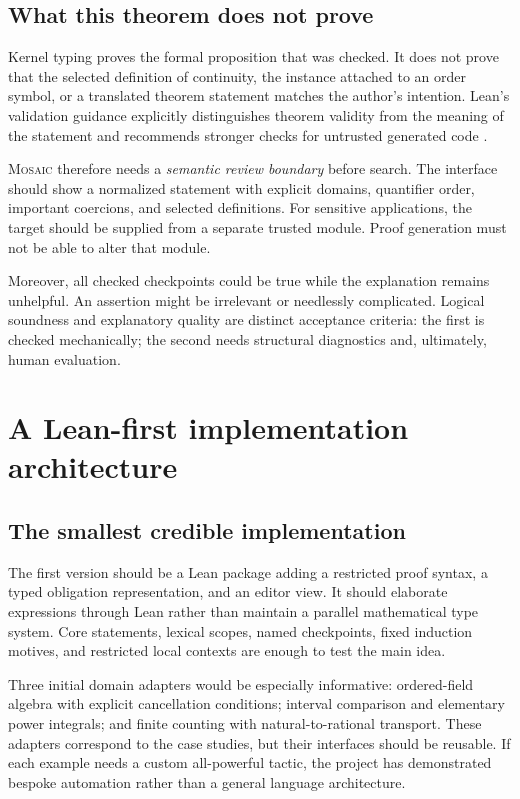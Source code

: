 \documentclass[11pt,a4paper]{article}
\newcommand{\Mosaic}{\textsc{Mosaic}}
\theoremstyle{definition}
\theoremstyle{remark}
\begin{document}
\subsection{What this theorem does not prove}
Kernel typing proves the formal proposition that was checked. It does not prove that the selected definition of continuity, the instance attached to an order symbol, or a translated theorem statement matches the author's intention. Lean's validation guidance explicitly distinguishes theorem validity from the meaning of the statement and recommends stronger checks for untrusted generated code \cite{lean-validation}.

\Mosaic{} therefore needs a \emph{semantic review boundary} before search. The interface should show a normalized statement with explicit domains, quantifier order, important coercions, and selected definitions. For sensitive applications, the target should be supplied from a separate trusted module. Proof generation must not be able to alter that module.

Moreover, all checked checkpoints could be true while the explanation remains unhelpful. An assertion might be irrelevant or needlessly complicated. Logical soundness and explanatory quality are distinct acceptance criteria: the first is checked mechanically; the second needs structural diagnostics and, ultimately, human evaluation.

\section{A Lean-first implementation architecture}
\label{sec:implementation}
\subsection{The smallest credible implementation}
The first version should be a Lean package adding a restricted proof syntax, a typed obligation representation, and an editor view. It should elaborate expressions through Lean rather than maintain a parallel mathematical type system. Core statements, lexical scopes, named checkpoints, fixed induction motives, and restricted local contexts are enough to test the main idea.

Three initial domain adapters would be especially informative: ordered-field algebra with explicit cancellation conditions; interval comparison and elementary power integrals; and finite counting with natural-to-rational transport. These adapters correspond to the case studies, but their interfaces should be reusable. If each example needs a custom all-powerful tactic, the project has demonstrated bespoke automation rather than a general language architecture.
\end{document}
